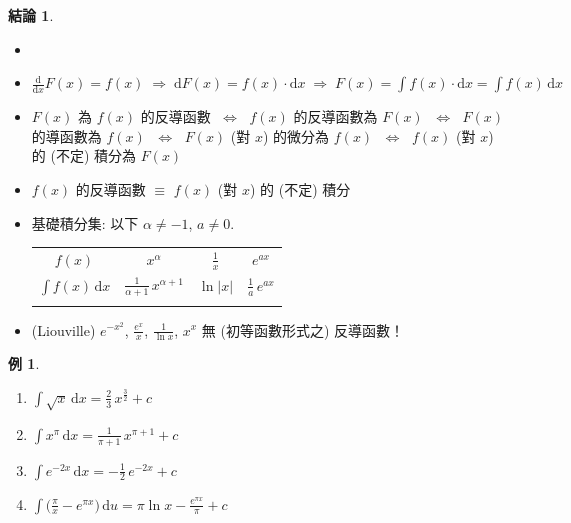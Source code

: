 \documentclass[12pt,a4paper]{extarticle}
\newcommand{\ds}{\displaystyle}
\newcommand{\ie}{\;\Longrightarrow\;}
\newcommand{\ifff}{\;\Longleftrightarrow\;}
\theoremstyle{definition}
\newtheorem*{fact}{結論}
\newtheorem*{ex}{例}
\begin{document}
\begin{fact}
  \begin{itemize}\setlength{\itemsep}{0pt}
    \item[]
    \item $\ds\frac{\text{d}}{\text{d}x} F(x) = f(x)\ie \text{d} F(x) = f(x)\cdot\text{d}x \ie F(x) = \int f(x)\cdot\text{d}x = \int f(x)\,\text{d}x$
    \item $F(x)$ 為 $f(x)$ 的反導函數 $\ifff$ $f(x)$ 的反導函數為 $F(x)$ $\ifff$ $F(x)$ 的導函數為 $f(x)$ $\ifff$ $F(x)$ (對 $x$) 的微分為 $f(x)$ $\ifff$ $f(x)$ (對 $x$) 的 (不定) 積分為 $F(x)$ 
    \item $f(x)$ 的反導函數 $\equiv$ $f(x)$ (對 $x$) 的 (不定) 積分
    \item 基礎積分集: 以下 $\ds\alpha\ne -1$, $a\ne 0$. 
      \begin{table}[!htbp]
        \centering
        \begin{tabular}{c|ccc}
          \toprule
          \addlinespace[2mm]
          $\ds f(x)$ & $\ds x^\alpha$ & $\ds\frac{1}{x}$ & $\ds e^{a x}$  \\
          \addlinespace[2mm]
          \midrule
          \addlinespace[2mm]
          $\ds \int f(x)\,\text{d}x$ & $\ds\frac{1}{\alpha + 1}\,x^{\alpha + 1}$ & $\ds\ln |x|$ & $\ds\frac{1}{a}\,e^{a x}$ \\
          \addlinespace[2mm]
          \bottomrule
        \end{tabular}
      \end{table}
    \item (Liouville) {\color{M4} $\ds e^{-x^2}$, $\ds\frac{e^x}{x}$, $\ds\frac{1}{\ln x}$, $\ds x^x$ 無 (初等函數形式之) 反導函數！}
  \end{itemize}
\end{fact}

\begin{ex}
  \setlength{\columnsep}{-7mm}
  \begin{multicols}{2}
    \begin{enumerate}\setlength{\itemsep}{0pt}
      \item $\ds\int\!\sqrt{x}\,\text{d}x = \frac{2}{3}\,x^{\frac{3}{2}} + c$
      \item $\ds\int x^\pi\,\text{d}x = \frac{1}{\pi + 1}\,x^{\pi + 1} + c$
      \item $\ds\int e^{-2x}\,\text{d}x = -\frac{1}{2}\,e^{-2 x} + c$
      \item $\ds\int\!\big(\frac{\pi}{x} - e^{\pi x}\big)\,\text{d}u = \pi\ln x - \frac{e^{\pi x}}{\pi} + c$
    \end{enumerate} 
  \end{multicols}
\end{ex}
\end{document}
